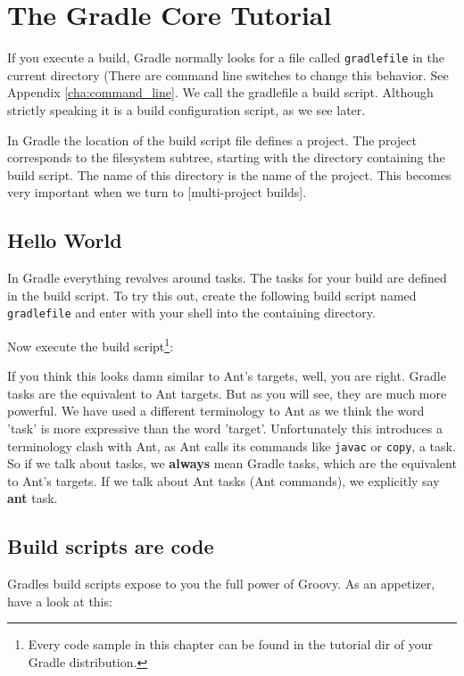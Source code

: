 \chapter{The Gradle Core Tutorial}

If you execute a build, Gradle normally looks for a file called \texttt{gradlefile} in the current directory (There are command line switches to change this behavior. See Appendix \ref{cha:command_line}. We call the gradlefile a build script. Although strictly speaking it is a build configuration script, as we see later.

In Gradle the location of the build script file defines a project. The project corresponds to the filesystem subtree, starting with the directory containing the build script. The name of this directory is the name of the project. This becomes very important when we turn to [multi-project builds].

\section{Hello World}
In Gradle everything revolves around tasks. The tasks for your build are defined in the build script. To try this out, create the following build script named \texttt{gradlefile} and enter with your shell into the containing directory.

Now execute the build script\footnote{Every code sample in this chapter can be found in the tutorial dir of your Gradle distribution.}:

If you think this looks damn similar to Ant's targets, well, you are right. Gradle tasks are the equivalent to Ant targets. But as you will see, they are much more powerful. We have used a different terminology to Ant as we think the word 'task' is more expressive than the word 'target'. Unfortunately this introduces a terminology clash with Ant, as Ant calls its commands like \texttt{javac} or \texttt{copy}, a task. So if we talk about tasks, we \textbf{always} mean Gradle tasks, which are the equivalent to Ant's targets. If we talk about Ant tasks (Ant commands), we explicitly say \textbf{ant} task.

\section{Build scripts are code}
Gradles build scripts expose to you the full power of Groovy. As an appetizer, have a look at this:

